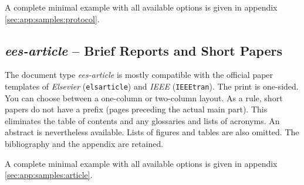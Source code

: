 A complete minimal example with all available options is given in appendix \ref{sec:app:samples:protocol}.




\subsection{\textit{ees-article} -- Brief Reports and Short Papers}
\label{sec:documentTypes:article}
The document type \textit{ees-article} is mostly compatible with the official paper templates of \textit{Elsevier} (\verb|elsarticle|) and \textit{IEEE} (\verb|IEEEtran|). The print is one-sided. You can choose between a one-column or two-column layout. As a rule, short papers do not have a prefix (pages preceding the actual main part). This eliminates the table of contents and any glossaries and lists of acronyms. An abstract is nevertheless available. Lists of figures and tables are also omitted. The bibliography and the appendix are retained.

A complete minimal example with all available options is given in appendix \ref{sec:app:samples:article}.




